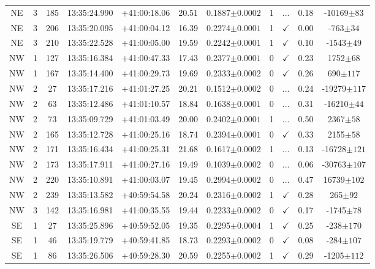 \begin{table}
\begin{tabular}{ccccccccccc}
		NE & 3 & 185 & 13:35:24.990 & +41:00:18.06 & 20.51 & 0.1887$\pm{0.0002}$ & 1 & ... & 0.18 & -10169$\pm{83}$ \\
		NE & 3 & 206 & 13:35:20.095 & +41:00:04.12 & 16.39 & 0.2274$\pm{0.0001}$ & 1 & $\checkmark$ & 0.00 & -763$\pm{34}$ \\
		NE & 3 & 210 & 13:35:22.528 & +41:00:05.00 & 19.59 & 0.2242$\pm{0.0001}$ & 1 & $\checkmark$ & 0.10 & -1543$\pm{49}$ \\
		NW & 1 & 127 & 13:35:16.384 & +41:00:47.33 & 17.43 & 0.2377$\pm{0.0001}$ & 0 & $\checkmark$ & 0.23 & 1752$\pm{68}$ \\
		NW & 1 & 167 & 13:35:14.400 & +41:00:29.73 & 19.69 & 0.2333$\pm{0.0002}$ & 0 & $\checkmark$ & 0.26 & 690$\pm{117}$ \\
		NW & 2 & 27 & 13:35:17.216 & +41:01:27.25 & 20.21 & 0.1512$\pm{0.0002}$ & 0 & ... & 0.24 & -19279$\pm{117}$ \\
		NW & 2 & 63 & 13:35:12.486 & +41:01:10.57 & 18.84 & 0.1638$\pm{0.0001}$ & 0 & ... & 0.31 & -16210$\pm{44}$ \\
		NW & 2 & 73 & 13:35:09.729 & +41:01:03.49 & 20.00 & 0.2402$\pm{0.0001}$ & 1 & ... & 0.50 & 2367$\pm{58}$ \\
		NW & 2 & 165 & 13:35:12.728 & +41:00:25.16 & 18.74 & 0.2394$\pm{0.0001}$ & 0 & $\checkmark$ & 0.33 & 2155$\pm{58}$ \\
		NW & 2 & 171 & 13:35:16.434 & +41:00:25.31 & 21.68 & 0.1617$\pm{0.0002}$ & 1 & ... & 0.13 & -16728$\pm{121}$ \\
		NW & 2 & 173 & 13:35:17.911 & +41:00:27.16 & 19.49 & 0.1039$\pm{0.0002}$ & 0 & ... & 0.06 & -30763$\pm{107}$ \\
		NW & 2 & 220 & 13:35:10.891 & +41:00:03.07 & 19.45 & 0.2994$\pm{0.0002}$ & 0 & ... & 0.47 & 16739$\pm{102}$ \\
		NW & 2 & 239 & 13:35:13.582 & +40:59:54.58 & 20.24 & 0.2316$\pm{0.0002}$ & 1 & $\checkmark$ & 0.28 & 265$\pm{92}$ \\
		NW & 3 & 142 & 13:35:16.981 & +41:00:35.55 & 19.44 & 0.2233$\pm{0.0002}$ & 0 & $\checkmark$ & 0.17 & -1745$\pm{78}$ \\
		SE & 1 & 27 & 13:35:25.896 & +40:59:52.05 & 19.35 & 0.2295$\pm{0.0004}$ & 1 & $\checkmark$ & 0.25 & -238$\pm{170}$ \\
		SE & 1 & 46 & 13:35:19.779 & +40:59:41.85 & 18.73 & 0.2293$\pm{0.0002}$ & 0 & $\checkmark$ & 0.08 & -284$\pm{107}$ \\
		SE & 1 & 86 & 13:35:26.506 & +40:59:28.30 & 20.59 & 0.2255$\pm{0.0002}$ & 1 & $\checkmark$ & 0.29 & -1205$\pm{112}$ \\

\end{tabular}
\end{table}
